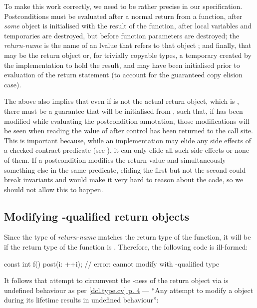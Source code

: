 To make this work correctly, we need to be rather precise in our specification. Postconditions must be evaluated after a normal return from a function, after \emph{some} object  is initialised with the result of the function, after local variables and temporaries are destroyed, but before function parameters are destroyed; the \emph{return-name} is the name of an lvalue that refers to that object ; and finally, that  may be the return object or, for trivially copyable types, a temporary created by the implementation to hold the result, and may have been initialised prior to evaluation of the return statement (to account for the guaranteed copy elision case).

The above also implies that even if  is not the actual return object, which is , there must be a guarantee that  will be initialised from , such that, if  has been modified while evaluating the postcondition annotation, those modifications will be seen when reading the value of  after control has been returned to the call site. This is important because, while an implementation may elide any side effects of a checked contract predicate (see \cite{P2751R1}), it can only elide all such side effects or none of them. If a postcondition modifies the return value and simultaneously something else in the same predicate, eliding the first but not the second could break invariants and would make it very hard to reason about the code, so we should not allow this to happen.

\subsection{Modifying -qualified return objects}
\label{subsec:ub}

Since the type of \emph{return-name} matches the return type of the function, it will be  if the return type of the function is . Therefore, the following code is ill-formed:

\begin{codeblock}
const int f()
  post(i: ++i);  // error: cannot modify  with -qualified type 
\end{codeblock}

It follows that attempt to circumvent the -ness of the return object via  is undefined behaviour as per \href{https://eel.is/c++draft/dcl.type.cv#4.sentence-1}{[dcl.type.cv] p. 4} --- ``Any attempt to modify a  object during its lifetime  results in undefined behaviour'':

